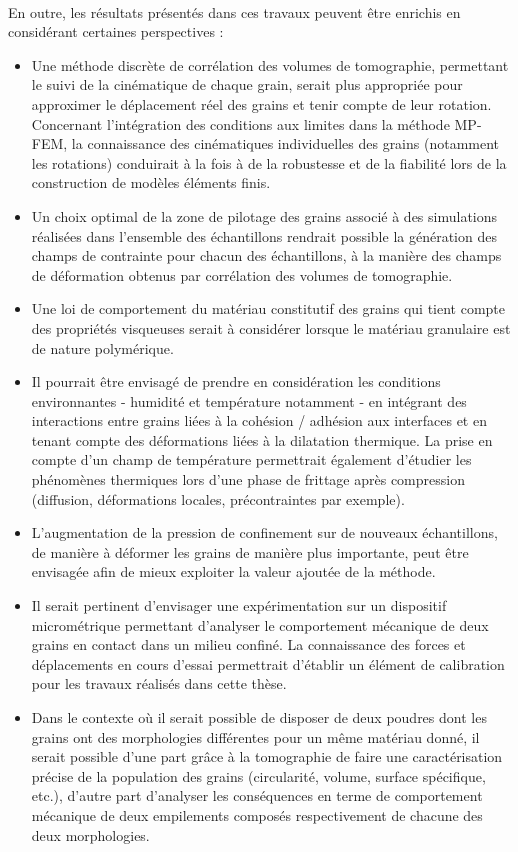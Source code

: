 \paragraph{}
En outre, les résultats présentés dans ces travaux peuvent être enrichis en considérant certaines perspectives :
\begin{itemize}
	\item Une méthode discrète de corrélation des volumes de tomographie, permettant le suivi de la cinématique de chaque grain, serait plus appropriée pour approximer le déplacement réel des grains et tenir compte de leur rotation. Concernant l’intégration des conditions aux limites dans la méthode MP-FEM, la connaissance des cinématiques individuelles des grains (notamment les rotations) conduirait à la fois à de la robustesse et de la fiabilité lors de la construction de modèles éléments finis.
	\item Un choix optimal de la zone de pilotage des grains associé à des simulations réalisées dans l'ensemble des échantillons rendrait possible la génération des champs de contrainte pour chacun des échantillons, à la manière des champs de déformation obtenus par corrélation des volumes de tomographie.
	\item Une loi de comportement du matériau constitutif des grains qui tient compte des propriétés visqueuses serait à considérer lorsque le matériau granulaire est de nature polymérique.
	\item Il pourrait être envisagé de prendre en considération les conditions environnantes - humidité et température notamment - en intégrant des interactions entre grains liées à la cohésion / adhésion aux interfaces et en tenant compte des déformations liées à la dilatation thermique. La prise en compte d'un champ de température permettrait également d'étudier les phénomènes thermiques lors d'une phase de frittage après compression (diffusion, déformations locales, précontraintes par exemple).
	\item L'augmentation de la pression de confinement sur de nouveaux échantillons, de manière à déformer les grains de manière plus importante, peut être envisagée afin de mieux exploiter la valeur ajoutée de la méthode.
	\item Il serait pertinent d'envisager une expérimentation sur un dispositif micrométrique permettant d'analyser le comportement mécanique de deux grains en contact dans un milieu confiné. La connaissance des forces et déplacements en cours d'essai permettrait d'établir un élément de calibration pour les travaux réalisés dans cette thèse.
	\item Dans le contexte où il serait possible de disposer de deux poudres dont les grains ont des morphologies différentes pour un même matériau donné, il serait possible d’une part grâce à la tomographie de faire une caractérisation précise de la population des grains (circularité, volume, surface spécifique, etc.), d’autre part d’analyser les conséquences en terme de comportement mécanique de deux empilements composés respectivement de chacune des deux morphologies.
\end{itemize}